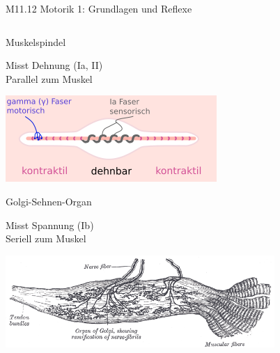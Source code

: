 \documentclass{beamer}
\begin{document}
\begin{frame}{M11.12 Motorik 1: Grundlagen und Reflexe} 


\begin{columns}[c]

\begin{column}{5cm}
\begin{block}{Muskelspindel}


Misst Dehnung (Ia, II) \\
Parallel zum Muskel \\

\begin{center}
    \includegraphics[width=\textwidth]{MuscleSpindle.png}
\end{center}

\end{block}

\begin{block}{Golgi-Sehnen-Organ}

Misst Spannung (Ib)\\
Seriell zum Muskel


\begin{center}
    \includegraphics[width=0.8\textwidth]{Gray938.png}
\end{center}


\end{block}
\end{column}

\pause

\begin{column}{5cm}


\end{column}
\end{columns}
\end{frame}
\end{document}
